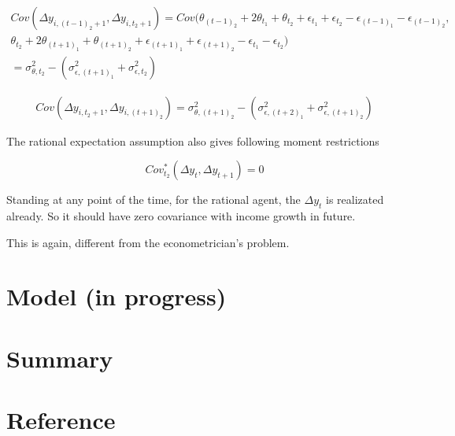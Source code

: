 \documentclass[12pt,notitlepage,onecolumn,aps,pra]{revtex4-1}
\begin{document}
\begin{equation}
\begin{split}
Cov ( \Delta y_{i,(t-1)_2+1},\Delta y_{i,t_2+1}) = Cov(\theta_{(t-1)_2} + 2\theta_{t_1} + \theta_{t_2} + \epsilon_{t_1} + \epsilon_{t_2} - \epsilon_{(t-1)_1} - \epsilon_{(t-1)_2} , \\
\theta_{t_2} + 2\theta_{(t+1)_1} + \theta_{(t+1)_2} + \epsilon_{(t+1)_1} + \epsilon_{(t+1)_2} - \epsilon_{t_1} - \epsilon_{t_2} ) \\
= \sigma^2_{\theta,t_2}-(\sigma^2_{\epsilon,(t+1)_1} + \sigma^2_{\epsilon,t_2})
\end{split}
\end{equation}

\begin{equation}
\begin{split}
Cov ( \Delta y_{i,t_2+1},\Delta y_{i,(t+1)_2}) = \sigma^2_{\theta,(t+1)_2}-(\sigma^2_{\epsilon,(t+2)_1} + \sigma^2_{\epsilon,(t+1)_2})
\end{split}
\end{equation}

The rational expectation assumption also gives following moment
restrictions

\begin{equation}
Cov^*_{t_2}(\Delta y_t, \Delta y_{t+1}) = 0
\end{equation}

Standing at any point of the time, for the rational agent, the
\(\Delta y_t\) is realizated already. So it should have zero covariance
with income growth in future.

This is again, different from the econometrician's problem.

    \hypertarget{model-in-progress}{%
\section{Model (in progress)}\label{model-in-progress}}

    \hypertarget{summary}{%
\section{Summary}\label{summary}}

    \hypertarget{reference}{%
\section{Reference}\label{reference}}


    
    



    
    
\end{document}
